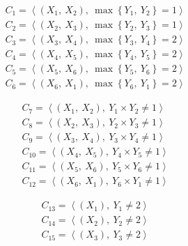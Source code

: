 \documentclass{article}
\begin{document}
\begin{fleqn}
\begin{equation}
\begin{aligned}
C_{1} = \left\langle \left( X_{1},\: X_{2} \right),\: \max\left\{ Y_{1},\: Y_{2} \right\} = 1 \right\rangle \\
C_{2} = \left\langle \left( X_{2},\: X_{3} \right),\: \max\left\{ Y_{2},\: Y_{3} \right\} = 1 \right\rangle \\
C_{3} = \left\langle \left( X_{3},\: X_{4} \right),\: \max\left\{ Y_{3},\: Y_{4} \right\} = 2 \right\rangle \\
C_{4} = \left\langle \left( X_{4},\: X_{5} \right),\: \max\left\{ Y_{4},\: Y_{5} \right\} = 2 \right\rangle \\
C_{5} = \left\langle \left( X_{5},\: X_{6} \right),\: \max\left\{ Y_{5},\: Y_{6} \right\} = 2 \right\rangle \\
C_{6} = \left\langle \left( X_{6},\: X_{1} \right),\: \max\left\{ Y_{6},\: Y_{1} \right\} = 2 \right\rangle
\end{aligned}
\end{equation}

\begin{equation}
\begin{aligned}
C_{7} = \left\langle \left( X_{1},\: X_{2} \right),\: Y_{1} \times Y_{2} \neq 1 \right\rangle \\
C_{8} = \left\langle \left( X_{2},\: X_{3} \right),\: Y_{2} \times Y_{3} \neq 1 \right\rangle \\
C_{9} = \left\langle \left( X_{3},\: X_{4} \right),\: Y_{3} \times Y_{4} \neq 1 \right\rangle \\
C_{10} = \left\langle \left( X_{4},\: X_{5} \right),\: Y_{4} \times Y_{5} \neq 1 \right\rangle \\
C_{11} = \left\langle \left( X_{5},\: X_{6} \right),\: Y_{5} \times Y_{6} \neq 1 \right\rangle \\
C_{12} = \left\langle \left( X_{6},\: X_{1} \right),\: Y_{6} \times Y_{1} \neq 1 \right\rangle
\end{aligned}
\end{equation}

\begin{equation}
\begin{aligned}
C_{13} = \left\langle \left( X_{1} \right),\: Y_{1} \neq 2 \right\rangle \\
C_{14} = \left\langle \left( X_{2} \right),\: Y_{2} \neq 2 \right\rangle \\
C_{15} = \left\langle \left( X_{3} \right),\: Y_{3} \neq 2 \right\rangle
\end{aligned}
\end{equation}
\end{fleqn}
\end{document}
